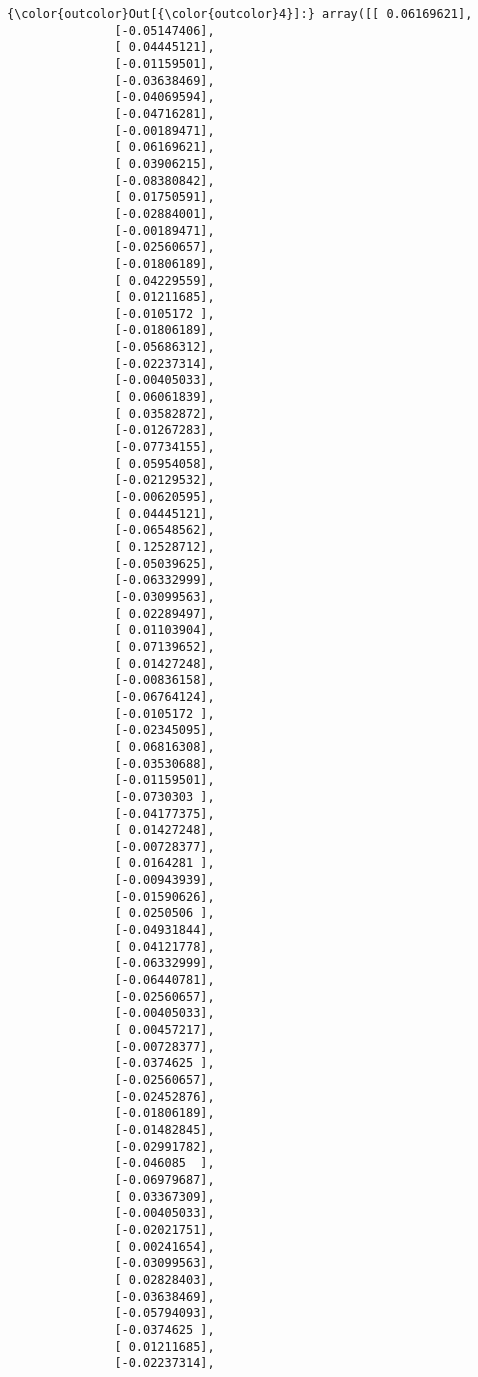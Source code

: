 \documentclass[11pt]{article}
\begin{document}
\begin{Verbatim}[commandchars=\\\{\}]
{\color{outcolor}Out[{\color{outcolor}4}]:} array([[ 0.06169621],
               [-0.05147406],
               [ 0.04445121],
               [-0.01159501],
               [-0.03638469],
               [-0.04069594],
               [-0.04716281],
               [-0.00189471],
               [ 0.06169621],
               [ 0.03906215],
               [-0.08380842],
               [ 0.01750591],
               [-0.02884001],
               [-0.00189471],
               [-0.02560657],
               [-0.01806189],
               [ 0.04229559],
               [ 0.01211685],
               [-0.0105172 ],
               [-0.01806189],
               [-0.05686312],
               [-0.02237314],
               [-0.00405033],
               [ 0.06061839],
               [ 0.03582872],
               [-0.01267283],
               [-0.07734155],
               [ 0.05954058],
               [-0.02129532],
               [-0.00620595],
               [ 0.04445121],
               [-0.06548562],
               [ 0.12528712],
               [-0.05039625],
               [-0.06332999],
               [-0.03099563],
               [ 0.02289497],
               [ 0.01103904],
               [ 0.07139652],
               [ 0.01427248],
               [-0.00836158],
               [-0.06764124],
               [-0.0105172 ],
               [-0.02345095],
               [ 0.06816308],
               [-0.03530688],
               [-0.01159501],
               [-0.0730303 ],
               [-0.04177375],
               [ 0.01427248],
               [-0.00728377],
               [ 0.0164281 ],
               [-0.00943939],
               [-0.01590626],
               [ 0.0250506 ],
               [-0.04931844],
               [ 0.04121778],
               [-0.06332999],
               [-0.06440781],
               [-0.02560657],
               [-0.00405033],
               [ 0.00457217],
               [-0.00728377],
               [-0.0374625 ],
               [-0.02560657],
               [-0.02452876],
               [-0.01806189],
               [-0.01482845],
               [-0.02991782],
               [-0.046085  ],
               [-0.06979687],
               [ 0.03367309],
               [-0.00405033],
               [-0.02021751],
               [ 0.00241654],
               [-0.03099563],
               [ 0.02828403],
               [-0.03638469],
               [-0.05794093],
               [-0.0374625 ],
               [ 0.01211685],
               [-0.02237314],

\end{Verbatim}
\end{document}
